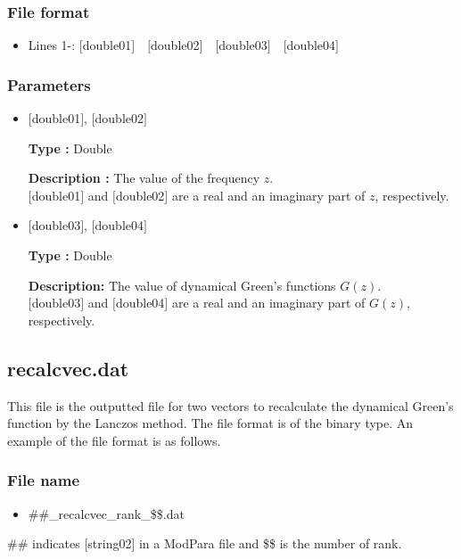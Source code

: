 \subsubsection{File format}
 \begin{itemize}
   \item  Lines 1-: $[$double01$]$~~$[$double02$]$~~$[$double03$]$~~$[$double04$]$
  \end{itemize}
  
\subsubsection{Parameters}
 \begin{itemize}

 \item  $[$double01$]$, $[$double02$]$

 {\bf Type :} Double

 {\bf Description :} The value of the frequency $z$.\\
$[$double01$]$ and $[$double02$]$ are a real and an imaginary part of $z$, respectively.\\

 \item  $[$double03$]$, $[$double04$]$

 {\bf Type :} Double 

 {\bf Description:} The value of dynamical Green's functions $G(z)$.\\
$[$double03$]$ and $[$double04$]$ are a real and an imaginary part of $G(z)$, respectively.\\

\end{itemize}


\newpage
\subsection{{recalcvec.dat}}
This file is the outputted file for two vectors to recalculate the dynamical Green's function by the Lanczos method. 
The file format is of the binary type.  An example of the file format is as follows.

\subsubsection{File name}
\begin{itemize}
   \item{\#\#\_recalcvec\_rank\_\$\$.dat}
\end{itemize}
\#\# indicates [string02] in a ModPara file and \$\$ is the number of rank. 

